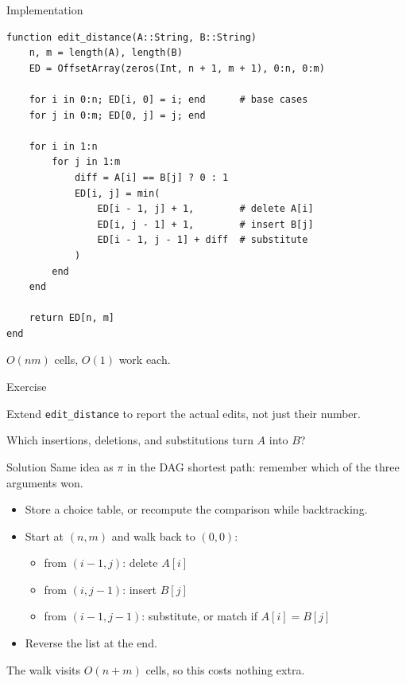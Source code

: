 \documentclass[10pt,aspectratio=169]{beamer}
\begin{document}
\begin{frame}[fragile]{Implementation}
  \begin{lstlisting}[basicstyle=\ttfamily\scriptsize]
function edit_distance(A::String, B::String)
    n, m = length(A), length(B)
    ED = OffsetArray(zeros(Int, n + 1, m + 1), 0:n, 0:m)

    for i in 0:n; ED[i, 0] = i; end      # base cases
    for j in 0:m; ED[0, j] = j; end

    for i in 1:n
        for j in 1:m
            diff = A[i] == B[j] ? 0 : 1
            ED[i, j] = min(
                ED[i - 1, j] + 1,        # delete A[i]
                ED[i, j - 1] + 1,        # insert B[j]
                ED[i - 1, j - 1] + diff  # substitute
            )
        end
    end

    return ED[n, m]
end
  \end{lstlisting}

  \begin{center}
    $O(nm)$ cells, $O(1)$ work each.
  \end{center}
\end{frame}

\begin{frame}{Exercise}
  \begin{center}
    Extend \texttt{edit\_distance} to report the actual edits, not just their
    number.
  \end{center}

  \bigskip
  \begin{center}
    \small Which insertions, deletions, and substitutions turn $A$ into $B$?
  \end{center}
\end{frame}

\begin{frame}{Solution}
  Same idea as $\pi$ in the DAG shortest path: remember \alert{which of the
  three} arguments won.

  \bigskip
  \begin{itemize}
    \item Store a choice table, or recompute the comparison while backtracking.
    \item Start at $(n, m)$ and walk back to $(0,0)$:
      \begin{itemize}
        \item[] from $(i-1,j)$: \; delete $A[i]$
        \item[] from $(i,j-1)$: \; insert $B[j]$
        \item[] from $(i-1,j-1)$: \; substitute, or match if $A[i] = B[j]$
      \end{itemize}
    \item Reverse the list at the end.
  \end{itemize}

  \bigskip
  \begin{center}
    \small The walk visits $O(n + m)$ cells, so this costs nothing extra.
  \end{center}
\end{frame}
\end{document}
